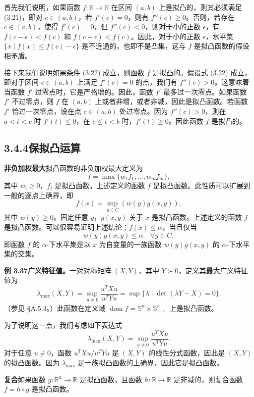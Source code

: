 \documentclass[UTF8,12pt,a4paper,fontset=fandol]{ctexart}
\DeclareMathOperator{\dom}{dom}
\begin{document}
首先我们说明，如果函数 $f:\mathbb{R}\to\mathbb{R}$ 在区间 $(a,b)$ 上是拟凸的，则其必须满足 (3.21)，即对 $c\in(a,b)$，若 $f'(c)=0$，则有 $f''(c)\geq0$。否则，若存在 $c\in(a,b)$，使得 $f'(c)=0$，但 $f''(c)<0$，则对于小的正数 $\epsilon$，有 $f(c-\epsilon)<f(c)$ 和 $f(c+\epsilon)<f(c)$。因此，对于小的正数 $\epsilon$，水平集 $\{x\mid f(x)\leq f(c)-\epsilon\}$ 是不连通的，也即不是凸集，这与 $f$ 是拟凸函数的假设相矛盾。

接下来我们说明如果条件 (3.22) 成立，则函数 $f$ 是拟凸的。假设式 (3.22) 成立，即对于区间 $c\in(a,b)$ 上满足 $f'(c)=0$ 的点，我们有 $f''(c)>0$。这意味着当函数 $f'$ 过零点时，它是严格增的。因此，函数 $f'$ 最多过一次零点。如果函数 $f'$ 不过零点，则 $f$ 在 $(a,b)$ 上或者非增，或者非减，因此是拟凸函数。若函数 $f'$ 恰过一次零点，设在点 $c\in(a,b)$ 处过零点。因为 $f''(c)>0$，则在 $a<t<c$ 时 $f'(t)\leq0$，在 $c\leq t<b$ 时，$f'(t)\geq0$。因此函数 $f$ 是拟凸的。

\subsection*{3.4.4\quad 保拟凸运算}

\noindent\textbf{非负加权最大}\quad 拟凸函数的非负加权最大定义为
\[
f=\max\{w_1f_1,\ldots,w_mf_m\},
\]
其中 $w_i\geq0$，$f_i$ 是拟凸函数。上述定义的函数 $f$ 是拟凸函数。此性质可以扩展到一般的逐点上确界，即
\[
f(x)=\sup_{y\in C}\left(w(y)g(x,y)\right),
\]
其中 $w(y)\geq0$。固定任意 $y$，$g(x,y)$ 关于 $x$ 是拟凸函数。上述定义的函数 $f$ 是拟凸函数。可以很容易证明上述结论：$f(x)\leq\alpha$，当且仅当
\[
w(y)g(x,y)\leq\alpha\quad \forall y\in C,
\]
即函数 $f$ 的 $\alpha$-下水平集是以 $x$ 为自变量的一族函数 $w(y)g(x,y)$ 的 $\alpha$-下水平集的交集。

\noindent\textbf{例 3.37\quad 广义特征值。}\quad 一对对称矩阵 $(X,Y)$，其中 $Y\succ0$，定义其最大广义特征值为
\[
\lambda_{\max}(X,Y)=\sup_{u\neq0}\frac{u^TXu}{u^TYu}
=\sup\{\lambda\mid \det(\lambda Y-X)=0\}.
\]
（参见 \S A.5.3。）此函数在定义域 $\dom f=\mathbb{S}^n\times\mathbb{S}_{++}^n$ 上是拟凸函数。

为了说明这一点，我们考虑如下表达式
\[
\lambda_{\max}(X,Y)=\sup_{u\neq0}\frac{u^TXu}{u^TYu}.
\]
对于任意 $u\neq0$，函数 $u^TXu/u^TYu$ 是 $(X,Y)$ 的线性分式函数，因此是 $(X,Y)$ 的拟凸函数。因为 $\lambda_{\max}$ 是一族拟凸函数的上确界，因此它是拟凸函数。

\noindent\textbf{复合}\quad 如果函数 $g:\mathbb{R}^n\to\mathbb{R}$ 是拟凸函数，且函数 $h:\mathbb{R}\to\mathbb{R}$ 是非减的，则复合函数 $f=h\circ g$ 是拟凸函数。
\end{document}
